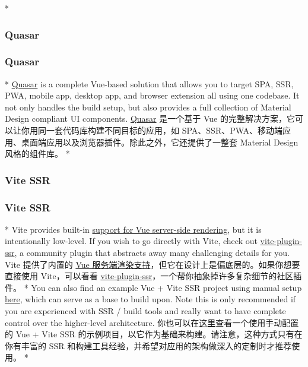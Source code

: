 \begin{paracol}{2}
\switchcolumn[0]*%
\subsubsection{Quasar}
\switchcolumn
\subsubsection{Quasar} 
\switchcolumn[0]*%
\href{https://quasar.dev/}{Quasar} is a complete Vue-based solution that
allows you to target SPA, SSR, PWA, mobile app, desktop app, and browser
extension all using one codebase. It not only handles the build setup,
but also provides a full collection of Material Design compliant UI
components.
\switchcolumn
\href{https://quasar.dev/}{Quasar} 是一个基于 Vue
的完整解决方案，它可以让你用同一套代码库构建不同目标的应用，如
SPA、SSR、PWA、移动端应用、桌面端应用以及浏览器插件。除此之外，它还提供了一整套
Material Design 风格的组件库。
\switchcolumn[0]*%
\subsubsection{Vite SSR}
\switchcolumn
\subsubsection{Vite SSR}
\switchcolumn[0]*%
Vite provides built-in \href{https://vitejs.dev/guide/ssr.html}{support
for Vue server-side rendering}, but it is intentionally low-level. If
you wish to go directly with Vite, check out
\href{https://vite-plugin-ssr.com/}{vite-plugin-ssr}, a community plugin
that abstracts away many challenging details for you.
\switchcolumn
Vite 提供了内置的 \href{https://cn.vitejs.dev/guide/ssr.html}{Vue
服务端渲染支持}，但它在设计上是偏底层的。如果你想要直接使用
Vite，可以看看
\href{https://vite-plugin-ssr.com/}{vite-plugin-ssr}，一个帮你抽象掉许多复杂细节的社区插件。
\switchcolumn[0]*%
You can also find an example Vue + Vite SSR project using manual setup
\href{https://github.com/vitejs/vite-plugin-vue/tree/main/playground/ssr-vue}{here},
which can serve as a base to build upon. Note this is only recommended
if you are experienced with SSR / build tools and really want to have
complete control over the higher-level architecture.
\switchcolumn
你也可以在\href{https://github.com/vitejs/vite-plugin-vue/tree/main/playground/ssr-vue}{这里}查看一个使用手动配置的
Vue + Vite SSR
的示例项目，以它作为基础来构建。请注意，这种方式只有在你有丰富的 SSR
和构建工具经验，并希望对应用的架构做深入的定制时才推荐使用。
\switchcolumn[0]*%

\end{paracol}

